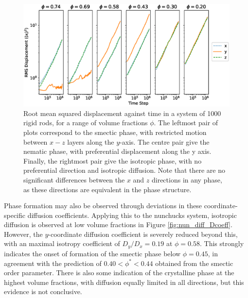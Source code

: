 \documentclass[11pt, a4paper]{article} %
\begin{document}
\begin{figure} [h!]
	\centering
	\includegraphics[width=\linewidth]{Figures/nun_diff_rmsplots}
	\caption{Root mean squared displacement against time in a system of 1000 rigid rods, for a range of volume fractions $\phi$. The leftmost pair of plots correspond to the smectic phase, with restricted motion between $x-z$ layers along the $y$-axis. The centre pair give the nematic phase, with preferential displacement along the y axis. Finally, the rightmost pair give the isotropic phase, with no preferential direction and isotropic diffusion. Note that there are no significant differences between the $x$ and $z$ directions in any phase, as these directions are equivalent in the phase structure.}
	\label{fig:nun_diff_rmsplots}
\end{figure}  %

Phase formation may also be observed through deviations in these coordinate-specific diffusion coefficients. Applying this to the nunchucks system, isotropic diffusion is observed at low volume fractions in Figure \ref{fig:nun_diff_Dcoeff}. However, the $y$-coordinate diffusion coefficient is severely reduced beyond this, with an maximal isotropy coefficient of $D_{y}/D_{x} = 0.19$ at $\phi = 0.58$. This strongly indicates the onset of formation of the smectic phase below $\phi = 0.45$, in agreement with the prediction of $ 0.40<\phi^{*}<0.44$ obtained from the smectic order parameter. There is also some indication of the crystalline phase at the highest volume fractions, with diffusion equally limited in all directions, but this evidence is not conclusive.
\end{document}
